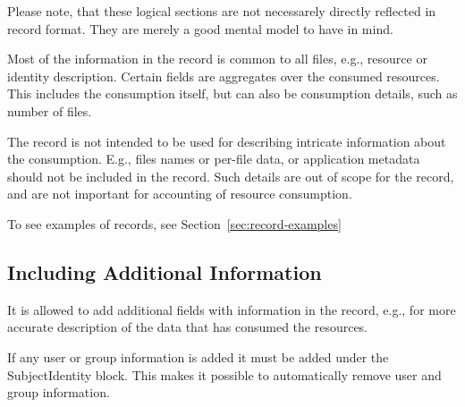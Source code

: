Please note, that these logical sections are not necessarely directly reflected
in record format. They are merely a good mental model to have in mind.

Most of the information in the record is common to all files, e.g., resource or
identity description. Certain fields are aggregates over the consumed
resources. This includes the consumption itself, but can also be consumption
details, such as number of files.

The record is not intended to be used for describing intricate information
about the consumption. E.g., files names or per-file data, or application
metadata should not be included in the record. Such details are out of scope
for the record, and are not important for accounting of resource consumption.

To see examples of records, see Section~\ref{sec:record-examples}


\subsection{Including Additional Information}

It is allowed to add additional fields with information in the record, e.g.,
for more accurate description of the data that has consumed the resources.

If any user or group information is added it must be added under the
SubjectIdentity block. This makes it possible to automatically remove user
and group information.

